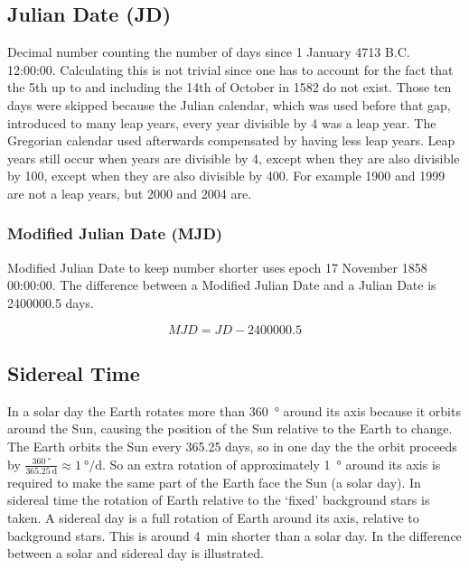 \subsection{Julian Date (JD)}

Decimal number counting the number of days since 1 January 4713 B.C.
12:00:00. Calculating this is not trivial since one has to account for
the fact that the 5th up to and including the 14th of October in 1582 do
not exist. Those ten days were skipped because the Julian calendar,
which was used before that gap, introduced to many leap years, every
year divisible by 4 was a leap year. The Gregorian calendar used
afterwards compensated by having less leap years. Leap years still occur
when years are divisible by 4, except when they are also divisible by
100, except when they are also divisible by 400. For example 1900 and
1999 are not a leap years, but 2000 and 2004 are. \cite{acf:2014aa}

\subsubsection{Modified Julian Date (MJD)}

Modified Julian Date to keep number shorter uses epoch 17 November 1858
00:00:00. The difference between a Modified Julian Date and a Julian
Date is 2400000.5 days.

\begin{equation}
    MJD = JD - 2400000.5
\end{equation}


\subsection{Sidereal Time}

In a solar day the Earth rotates more than \SI{360}{\degree} around its
axis because it orbits around the Sun, causing the position of the Sun
relative to the Earth to change. The Earth orbits the Sun every 365.25
days, so in one day the the orbit proceeds by
$\frac{\SI{360}{\degree}}{\SI{365.25}{\day}} \approx
\SI{1}{\degree\per\day}$. So an extra rotation of approximately
\SI{1}{\degree} around its axis is required to make the same part of the
Earth face the Sun (a solar day). In sidereal time the rotation of Earth
relative to the `fixed' background stars is taken. A sidereal day is a
full rotation of Earth around its axis, relative to background stars.
This is around \SI{4}{\minute} shorter than a solar day. In
 the difference between a solar and sidereal
day is illustrated.

